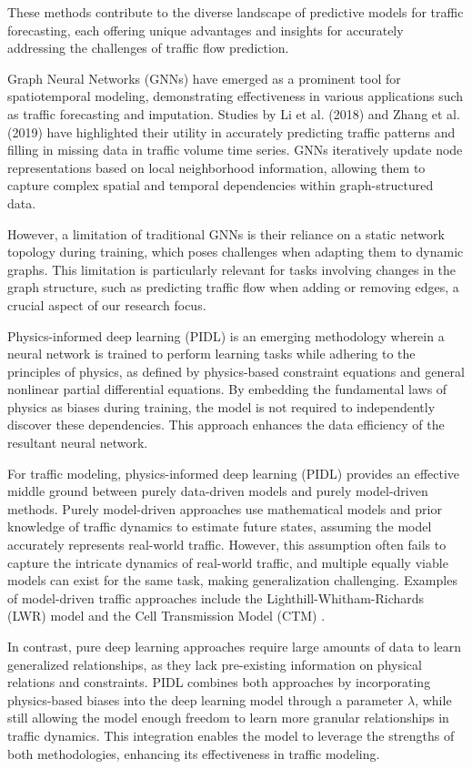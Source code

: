 These methods contribute to the diverse landscape of predictive models for traffic forecasting, each offering unique advantages and insights for accurately addressing the challenges of traffic flow prediction.

Graph Neural Networks (GNNs) \cite{gnn} have emerged as a prominent tool for spatiotemporal modeling, demonstrating effectiveness in various applications such as traffic forecasting and imputation. Studies by Li et al. (2018) and Zhang et al. (2019) have highlighted their utility in accurately predicting traffic patterns and filling in missing data in traffic volume time series. GNNs iteratively update node representations based on local neighborhood information, allowing them to capture complex spatial and temporal dependencies within graph-structured data. 

However, a limitation of traditional GNNs is their reliance on a static network topology during training, which poses challenges when adapting them to dynamic graphs. This limitation is particularly relevant for tasks involving changes in the graph structure, such as predicting traffic flow when adding or removing edges, a crucial aspect of our research focus.

Physics-informed deep learning (PIDL) \cite{raissi2017physics} is an emerging methodology wherein a neural network is trained to perform learning tasks while adhering to the principles of physics, as defined by physics-based constraint equations and general nonlinear partial differential equations. By embedding the fundamental laws of physics as biases during training, the model is not required to independently discover these dependencies. This approach enhances the data efficiency of the resultant neural network.

For traffic modeling, physics-informed deep learning (PIDL) provides an effective middle ground between purely data-driven models and purely model-driven methods. Purely model-driven approaches use mathematical models and prior knowledge of traffic dynamics to estimate future states, assuming the model accurately represents real-world traffic. However, this assumption often fails to capture the intricate dynamics of real-world traffic, and multiple equally viable models can exist for the same task, making generalization challenging. Examples of model-driven traffic approaches include the Lighthill-Whitham-Richards (LWR) \cite{lwr} model and the Cell Transmission Model (CTM) \cite{ctm}. 

In contrast, pure deep learning approaches require large amounts of data to learn generalized relationships, as they lack pre-existing information on physical relations and constraints. PIDL combines both approaches by incorporating physics-based biases into the deep learning model through a parameter \(\lambda\), while still allowing the model enough freedom to learn more granular relationships in traffic dynamics. This integration enables the model to leverage the strengths of both methodologies, enhancing its effectiveness in traffic modeling.
